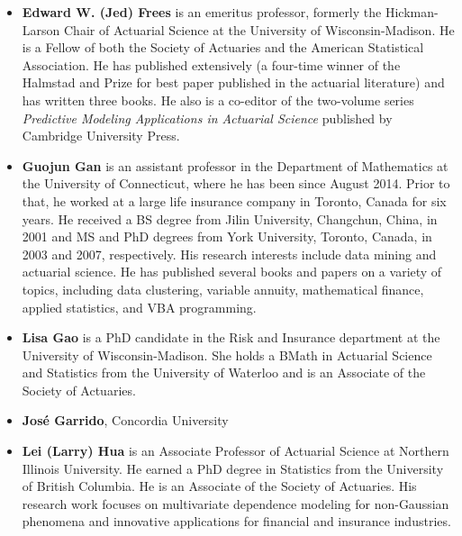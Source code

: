 \documentclass[]{book}
\providecommand{\tightlist}{%
  \setlength{\itemsep}{0pt}\setlength{\parskip}{0pt}}
\begin{document}
\begin{itemize}
\tightlist
\item
  \textbf{Edward W. (Jed) Frees} is an emeritus professor, formerly the
  Hickman-Larson Chair of Actuarial Science at the University of
  Wisconsin-Madison. He is a Fellow of both the Society of Actuaries and
  the American Statistical Association. He has published extensively (a
  four-time winner of the Halmstad and Prize for best paper published in
  the actuarial literature) and has written three books. He also is a
  co-editor of the two-volume series \emph{Predictive Modeling
  Applications in Actuarial Science} published by Cambridge University
  Press.
\end{itemize}

\begin{itemize}
\tightlist
\item
  \textbf{Guojun Gan} is an assistant professor in the Department of
  Mathematics at the University of Connecticut, where he has been since
  August 2014. Prior to that, he worked at a large life insurance
  company in Toronto, Canada for six years. He received a BS degree from
  Jilin University, Changchun, China, in 2001 and MS and PhD degrees
  from York University, Toronto, Canada, in 2003 and 2007, respectively.
  His research interests include data mining and actuarial science. He
  has published several books and papers on a variety of topics,
  including data clustering, variable annuity, mathematical finance,
  applied statistics, and VBA programming.
\end{itemize}

\begin{itemize}
\tightlist
\item
  \textbf{Lisa Gao} is a PhD candidate in the Risk and Insurance
  department at the University of Wisconsin-Madison. She holds a BMath
  in Actuarial Science and Statistics from the University of Waterloo
  and is an Associate of the Society of Actuaries.
\end{itemize}

\begin{itemize}
\tightlist
\item
  \textbf{José Garrido}, Concordia University
\end{itemize}

\begin{itemize}
\tightlist
\item
  \textbf{Lei (Larry) Hua} is an Associate Professor of Actuarial
  Science at Northern Illinois University. He earned a PhD degree in
  Statistics from the University of British Columbia. He is an Associate
  of the Society of Actuaries. His research work focuses on multivariate
  dependence modeling for non-Gaussian phenomena and innovative
  applications for financial and insurance industries.
\end{itemize}
\end{document}
